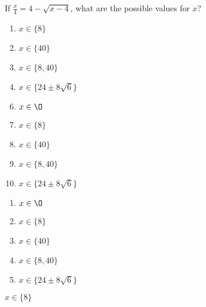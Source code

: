  
If {\Large$\frac{x}{4}$}$=4-\sqrt{x-4}$,
what are the possible values for $x$?


\ifsat
	\begin{enumerate}[label=\Alph*)]
		\item $x\in\{8 \} $ %
		\item $x\in\{40 \} $ 
		\item $x\in\{8,40 \} $
		\item $x\in\{24\pm8\sqrt{6} \}$
	\end{enumerate}
\else
\fi

\ifacteven
	\begin{enumerate}[label=\textbf{\Alph*.},itemsep=\fill,align=left]
		\setcounter{enumii}{5}
		\item $x\in \O $ 
		\item $x\in\{8 \} $ %
		\item $x\in\{40 \} $ 
		\addtocounter{enumii}{1}
		\item $x\in\{8,40 \} $
		\item $x\in\{24\pm8\sqrt{6} \}$
	\end{enumerate}
\else
\fi

\ifactodd
	\begin{enumerate}[label=\textbf{\Alph*.},itemsep=\fill,align=left]
		\item $x\in \O $ 
		\item $x\in\{8 \} $ %
		\item $x\in\{40 \} $ 
		\item $x\in\{8,40 \} $
		\item $x\in\{24\pm8\sqrt{6} \}$
	\end{enumerate}
\else
\fi

\ifgridin
 $x\in\{8 \} $ %
		
\else
\fi

